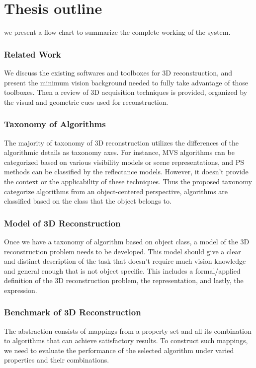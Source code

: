 \section{Thesis outline}
we present a flow chart to summarize the complete working of the system.

\subsubsection{Related Work}
We discuss the existing softwares and toolboxes for 3D reconstruction, and present the minimum vision background needed to fully take advantage of those toolboxes. Then a review of 3D acquisition techniques is provided, organized by the visual and geometric cues used for reconstruction.

\subsubsection{Taxonomy of Algorithms}
The majority of taxonomy of 3D reconstruction utilizes the differences of the algorithmic details as taxonomy axes. For instance, MVS algorithms can be categorized based on various visibility models or scene representations, and PS methods can be classified by the reflectance models. However, it doesn't provide the context or the applicability of these techniques. Thus the proposed taxonomy categorize algorithms from an object-centered perspective, \ie algorithms are classified based on the class that the object belongs to.

\subsubsection{Model of 3D Reconstruction}
Once we have a taxonomy of algorithm based on object class, a model of the 3D reconstruction problem needs to be developed. This model should give a clear and distinct description of the task that doesn't require much vision knowledge and general enough that is not object specific. This includes a formal/applied definition of the 3D reconstruction problem, the representation, and lastly, the expression.

\subsubsection{Benchmark of 3D Reconstruction}
The abstraction consists of mappings from a property set and all its combination to algorithms that can achieve satisfactory results. To construct such mappings, we need to evaluate the performance of the selected algorithm under varied properties and their combinations.

